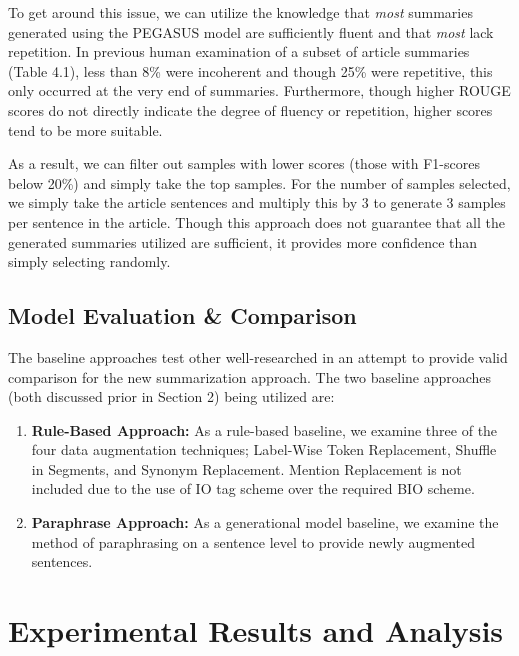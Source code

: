 \documentclass[12pt]{report}
\begin{document}
            To get around this issue, we can utilize the knowledge that \textit{most} summaries generated using the PEGASUS model are sufficiently fluent and that \textit{most} lack repetition. In previous human examination of a subset of article summaries (Table 4.1), less than 8\% were incoherent and though 25\% were repetitive, this only occurred at the very end of summaries. Furthermore, though higher ROUGE scores do not directly indicate the degree of fluency or repetition, higher scores tend to be more suitable.
            
            As a result, we can filter out samples with lower scores (those with F1-scores below 20\%) and simply take the top samples. For the number of samples selected, we simply take the article sentences and multiply this by 3 to generate 3 samples per sentence in the article. Though this approach does not guarantee that all the generated summaries utilized are sufficient, it provides more confidence than simply selecting randomly.
    
    \newpage
    \section{Model Evaluation \& Comparison}
        The baseline approaches test other well-researched in an attempt to provide valid comparison for the new summarization approach. The two baseline approaches (both discussed prior in Section 2) being utilized are:
        
        \begin{enumerate}
            \item \textbf{Rule-Based Approach:} As a rule-based baseline, we examine three of the four data augmentation techniques; Label-Wise Token Replacement, Shuffle in Segments, and Synonym Replacement. Mention Replacement is not included due to the use of IO tag scheme over the required BIO scheme.
            \item \textbf{Paraphrase Approach:} As a generational model baseline, we examine the method of paraphrasing on a sentence level to provide newly augmented sentences.
        \end{enumerate}
        











\chapter{Experimental Results and Analysis}
    
\end{document}
